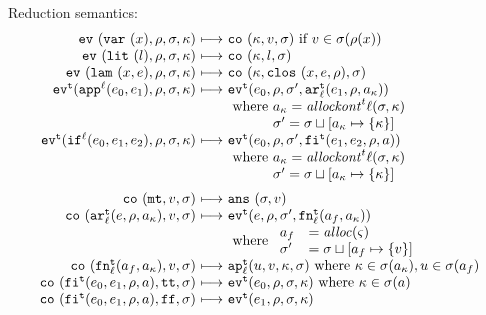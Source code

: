 \documentclass{llncs}
\begin{document}
Reduction semantics:
\begin{gather*}
\begin{array}{@{}r@{\ }c@{\ }l@{}}
\ev{\svar\mvar,\menv,\msto,\mkont} &\machstep&
\co{\mkont,\mval,\msto} \text{ if } \mval \in \msto(\menv(\mvar))
\\
\ev{\slit\mlit,\menv,\msto,\mkont} &\machstep&
\co{\mkont,\mlit,\msto}
\\
\ev{\slam\mvar\mexp,\menv,\msto,\mkont} &\machstep&
\co{\mkont,\clos{\mvar,\mexp,\menv},\msto}
\\
\ev[^\mcntr]{\sapp[^\mlab]{\mexpi0}{\mexpi1},\menv,\msto,\mkont} &\machstep&
\ev[^\mcntr]{\mexpi{0},\menv,\msto',\kar[_\mlab^\mcntr]{\mexpi{1},\menv,\maddr_\mkont}}
\\
&&
\text{ where }\maddr_\mkont = \allockont^\mcntr\mlab(\msto,\mkont) \\
&&\phantom{\text{ where }}\msto' = \msto\sqcup[\maddr_\mkont \mapsto \setof{\mkont}]
\\
\ev[^\mcntr]{\sif[^\mlab]{\mexpi0}{\mexpi1}{\mexpi2},\menv,\msto,\mkont} &\machstep&
\ev[^\mcntr]{\mexpi0,\menv,\msto',\kif[^\mcntr]{\mexpi1,\mexpi2,\menv,\maddr}}
\\
&&
\text{ where }\maddr_\mkont = \allockont^\mcntr\mlab(\msto,\mkont) \\
&&\phantom{\text{ where }}\msto' = \msto\sqcup[\maddr_\mkont \mapsto \setof{\mkont}]
\\[2mm]
\co{\kmt,\mval,\msto} &\machstep&
\ans{\msto,\mval}
\\
\co{\kar[^\mcntr_\mlab]{\mexp,\menv,\maddr_\mkont},\mval,\msto} & \machstep&
\ev[^\mcntr]{\mexp,\menv,\msto',\kfn[^\mcntr_\mlab]{\maddr_f,\maddr_\mkont}}
\\
&&
\text{ where }
\begin{array}{ll}
 \maddr_f &= \alloc(\mstate) \\
 \msto' &= \msto\sqcup[\maddr_f \mapsto \{\mval\}]
\end{array}
\\
\co{\kfn[^\mcntr_\mlab]{\maddr_f,\maddr_\mkont},\mval,\msto} & \machstep&
\ap[^\mcntr_\mlab]{\mvalx{u},\mval,\mkont,\msto}
\text{ where } \mkont \in \msto(\maddr_\mkont), \mvalx{u} \in \msto(\maddr_f)
\\
\co{\kif[^\mcntr]{\mexpi0,\mexpi1,\menv,\maddr},\strue,\msto} & \machstep&
\ev[^\mcntr]{\mexpi0,\menv,\msto,\mkont}
\text{ where }\mkont\in\msto(\maddr)
\\
\co{\kif[^\mcntr]{\mexpi0,\mexpi1,\menv,\maddr},\sfalse,\msto} & \machstep&
\ev[^\mcntr]{\mexpi1,\menv,\msto,\mkont}

\end{array}
\end{gather*}
\end{document}
